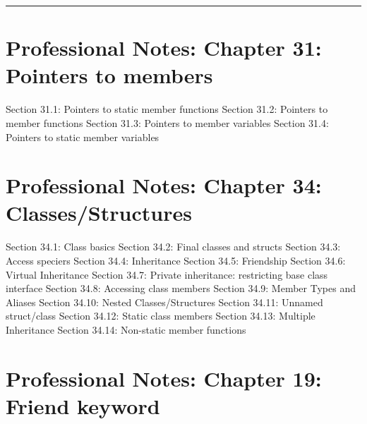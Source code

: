 \begin{center}\rule{0.5\linewidth}{0.5pt}\end{center}

\hypertarget{professional-notes-chapter-31-pointers-to-members}{%
\chapter{Professional Notes: Chapter 31: Pointers to
members}\label{professional-notes-chapter-31-pointers-to-members}}

Section 31.1: Pointers to static member functions Section 31.2: Pointers
to member functions Section 31.3: Pointers to member variables Section
31.4: Pointers to static member variables

\hypertarget{professional-notes-chapter-34-classesstructures}{%
\chapter{Professional Notes: Chapter 34:
Classes/Structures}\label{professional-notes-chapter-34-classesstructures}}

Section 34.1: Class basics Section 34.2: Final classes and structs
Section 34.3: Access speciers Section 34.4: Inheritance Section 34.5:
Friendship Section 34.6: Virtual Inheritance Section 34.7: Private
inheritance: restricting base class interface Section 34.8: Accessing
class members Section 34.9: Member Types and Aliases Section 34.10:
Nested Classes/Structures Section 34.11: Unnamed struct/class Section
34.12: Static class members Section 34.13: Multiple Inheritance Section
34.14: Non-static member functions

\hypertarget{professional-notes-chapter-19-friend-keyword}{%
\chapter{Professional Notes: Chapter 19: Friend
keyword}\label{professional-notes-chapter-19-friend-keyword}}

